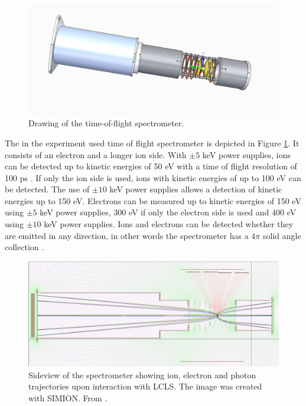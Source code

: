 \begin{figure}
   \includegraphics[width=1.\linewidth]{images/spectrometer.jpg}
    \caption{Drawing of the time-of-flight spectrometer.}
\label{fig:spectrometer-detail}
\end{figure}
The in the experiment used time of flight spectrometer is depicted in Figure \ref{fig:spectrometer-detail}. It consists of an electron and a longer ion side. With $\pm 5$ keV power supplies, ions can be detected up to kinetic energies of 50 eV with a time of flight resolution of 100 ps \citep{Ferguson-2015-JSR}. If only the ion side is used, ions with kinetic energies of up to 100 eV can be detected. The use of $\pm 10$ keV power supplies allows a detection of kinetic energies up to 150 eV. Electrons can be measured up to kinetic energies of 150 eV using $\pm 5$ keV power supplies, 300 eV if only the electron side is used and 400 eV using $\pm 10$ keV power supplies. Ions and electrons can be detected whether they are emitted in any direction, in other words the spectrometer has a $4\pi$ solid angle collection \citep{Osipov-2013-PC}.
\begin{figure}
   \includegraphics[width=1.\linewidth]{images/simion.jpg}
    \caption[Sideview of the spectrometer showing ion, electron and photon trajectories.]{Sideview of the spectrometer showing ion, electron and photon trajectories upon interaction with LCLS. The image was created with SIMION. From \citep{Osipov-2013-PC}.}
\label{fig:simion}
\end{figure}
